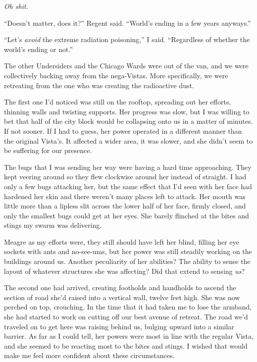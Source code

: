 \emph{Oh shit.}



``Doesn't matter, does it?'' Regent said.  ``World's ending in a few years anyways.''



``Let's \emph{avoid} the extreme radiation poisoning,'' I said.  ``Regardless of whether the world's ending or not.''



The other Undersiders and the Chicago Wards were out of the van, and we were collectively backing away from the nega-Vistas.  More specifically, we were retreating from the one who was creating the radioactive dust.



The first one I'd noticed was still on the rooftop, spreading out her efforts, thinning walls and twisting supports.  Her progress was slow, but I was willing to bet that half of the city block would be collapsing onto us in a matter of minutes.  If not sooner.  If I had to guess, her power operated in a different manner than the original Vista's.  It affected a wider area, it was slower, and she didn't seem to be suffering for our presence.



The bugs that I was sending her way were having a hard time approaching.  They kept veering around so they flew clockwise around her instead of straight.  I had only a few bugs attacking her, but the same effect that I'd seen with her face had hardened her skin and there weren't many places left to attack.  Her mouth was little more than a lipless slit across the lower half of her face, firmly closed, and only the smallest bugs could get at her eyes.  She barely flinched at the bites and stings my swarm was delivering.



Meagre as my efforts were, they still should have left her blind, filling her eye sockets with ants and no-see-ums, but her power was still steadily working on the buildings around us.  Another peculiarity of her abilities?  The ability to sense the layout of whatever structures she was affecting?  Did that extend to sensing \emph{us}?



The second one had arrived, creating footholds and handholds to ascend the section of road she'd raised into a vertical wall, twelve feet high.  She was now perched on top, crouching.  In the time that it had taken me to lose the armband, she had started to work on cutting off our best avenue of retreat.  The road we'd traveled on to get here was raising behind us, bulging upward into a similar barrier.  As far as I could tell, her powers were most in line with the regular Vista, and she seemed to be reacting most to the bites and stings.  I wished that would make me feel more confident about these circumstances.




